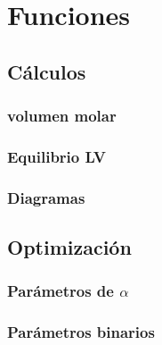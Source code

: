 \chapter{Funciones}
	\section{Cálculos}

		
		
		
		
		
		
		\subsection{volumen molar}
		\subsection{Equilibrio LV}
		
		
		
		
		
		
		

		
		\subsection{Diagramas}
	\section{Optimización}	
		\subsection{Parámetros de $\alpha$}
		\subsection{Parámetros binarios}
